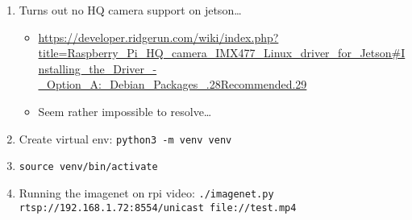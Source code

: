 \documentclass[a4paper,11pt]{article}
\begin{document}
\begin{enumerate}
	\item Turns out no HQ camera support on jetson\dots
		\begin{itemize}
			\item \url{https://developer.ridgerun.com/wiki/index.php?title=Raspberry_Pi_HQ_camera_IMX477_Linux_driver_for_Jetson#Installing_the_Driver_-_Option_A:_Debian_Packages_.28Recommended.29}
			\item Seem rather impossible to resolve\dots
		\end{itemize}
	\item Create virtual env: \texttt{python3 -m venv venv}
	\item \texttt{source venv/bin/activate}
	\item Running the imagenet on rpi video: \texttt{./imagenet.py rtsp://192.168.1.72:8554/unicast file://test.mp4}
\end{enumerate}





%
%
\end{document}
